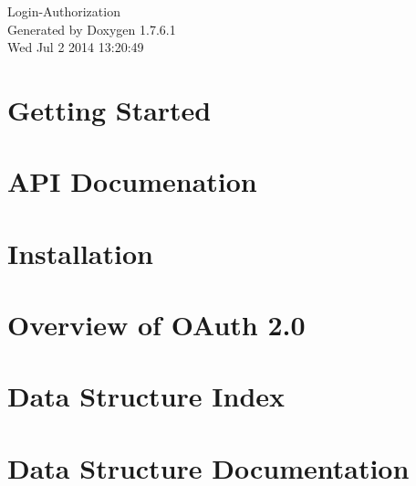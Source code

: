 \documentclass[a4paper]{book}
\begin{document}
\hypersetup{pageanchor=false,citecolor=blue}
\begin{titlepage}
\vspace*{7cm}
\begin{center}
{\Large \-Login-\/\-Authorization }\\
\vspace*{1cm}
{\large \-Generated by Doxygen 1.7.6.1}\\
\vspace*{0.5cm}
{\small Wed Jul 2 2014 13:20:49}\\
\end{center}
\end{titlepage}
\clearemptydoublepage
{}
\tableofcontents
\clearemptydoublepage
{}
\hypersetup{pageanchor=true,citecolor=blue}
\chapter{\-Getting \-Started}
\label{index}\hypertarget{index}{}
\chapter{\-A\-P\-I \-Documenation}
\label{api}
\hypertarget{api}{}

\chapter{\-Installation}
\label{install}
\hypertarget{install}{}

\chapter{\-Overview of \-O\-Auth 2.0}
\label{oauth}
\hypertarget{oauth}{}

\chapter{\-Data \-Structure \-Index}

\chapter{\-Data \-Structure \-Documentation}



\printindex
\end{document}
